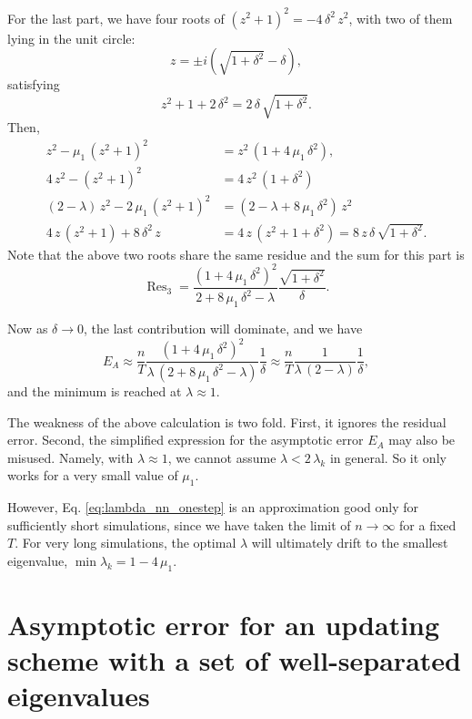 \documentclass[preprint, floatfix]{revtex4-1}
\newcommand{\Err}{E}
\begin{document}
{For the last part,
we have four roots of
$(z^2 + 1)^2 = - 4 \, \delta^2 \, z^2$,
with two of them lying in the unit circle:
$$
z = \pm i \left( \sqrt{ 1 + \delta^2 } - \delta \right),
$$
satisfying
$$
z^2 + 1 + 2 \, \delta^2 = 2 \, \delta \, \sqrt{1 + \delta^2}.
$$
Then,
$$
\begin{aligned}
z^2 - \mu_1 \, \left( z^2 + 1 \right)^2
&= z^2 \, (1 + 4 \, \mu_1 \, \delta^2),
\\
4 \, z^2 - \left( z^2 + 1 \right)^2
&=
4 \, z^2 \, (1 + \delta^2)
\\
%
(2 - \lambda) \, z^2
- 2 \, \mu_1 \, \left( z^2 + 1 \right)^2
&=
\left(
  2 - \lambda + 8 \, \mu_1 \, \delta^2
\right) \, z^2
\\
%
4 \, z \, \left( z^2 + 1 \right)
+
8 \, \delta^2 \, z
&=
4 \, z \, (z^2 + 1 + \delta^2)
=
8 \, z \, \delta \, \sqrt{ 1 + \delta^2 }.
\end{aligned}
$$
Note that the above two roots share the same
residue and the sum for this part is
$$
\operatorname{Res}_3
=
\frac{ \left( 1 + 4 \, \mu_1 \, \delta^2 \right)^2 }
     {        2 + 8 \, \mu_1 \, \delta^2 - \lambda }
\frac{ \sqrt{ 1 + \delta^2 } }
     {        \delta         }.
$$

Now as $\delta \to 0$, the last contribution will dominate,
and we have
$$
\Err_A
\approx
\frac{ n } { T }
\frac{ (1 + 4 \, \mu_1 \, \delta^2)^2 }
{ \lambda \, (2 + 8 \, \mu_1 \, \delta^2 - \lambda) }
\frac{ 1 } { \delta }
\approx
\frac{ n } { T }
\frac{ 1 }
{ \lambda \, (2 - \lambda) }
\frac{ 1 } { \delta },
$$
and the minimum is reached at $\lambda \approx 1$.

The weakness of the above calculation is two fold.
%
First, it ignores the residual error.
%
Second, the simplified expression for the asymptotic error
$E_A$ may also be misused.
%
Namely, with $\lambda \approx 1$,
we cannot assume $\lambda < 2 \, \lambda_k$ in general.
%
So it only works for a very small value of $\mu_1$.
}



However, Eq. \eqref{eq:lambda_nn_onestep}
is an approximation good only
for sufficiently short simulations,
since we have taken the limit of $n \to \infty$
for a fixed $T$.
%
For very long simulations,
the optimal $\lambda$
will ultimately drift to
the smallest eigenvalue,
$\min \lambda_k = 1 - 4 \, \mu_1$.





\section{\label{sec:upperbound}
Asymptotic error for an updating scheme
with a set of well-separated eigenvalues}
\end{document}
